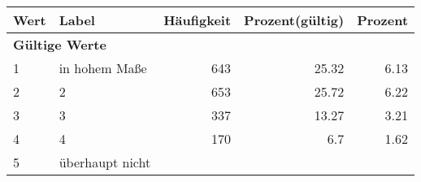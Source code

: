      \begin{longtable}{lXrrr}
     \toprule
     \textbf{Wert} & \textbf{Label} & \textbf{Häufigkeit} & \textbf{Prozent(gültig)} & \textbf{Prozent} \\
     \endhead
     \midrule
     \multicolumn{5}{l}{\textbf{Gültige Werte}}\\

     1 &
     \multicolumn{1}{X}{ in hohem Maße   } &


       \num{643} &
       \num[round-mode=places,round-precision=2]{25.32} &
         \num[round-mode=places,round-precision=2]{6.13} \\

     2 &
     \multicolumn{1}{X}{ 2   } &


       \num{653} &
       \num[round-mode=places,round-precision=2]{25.72} &
         \num[round-mode=places,round-precision=2]{6.22} \\

     3 &
     \multicolumn{1}{X}{ 3   } &


       \num{337} &
       \num[round-mode=places,round-precision=2]{13.27} &
         \num[round-mode=places,round-precision=2]{3.21} \\

     4 &
     \multicolumn{1}{X}{ 4   } &


       \num{170} &
       \num[round-mode=places,round-precision=2]{6.7} &
         \num[round-mode=places,round-precision=2]{1.62} \\

     5 &
     \multicolumn{1}{X}{ überhaupt nicht   } &



\end{longtable}
